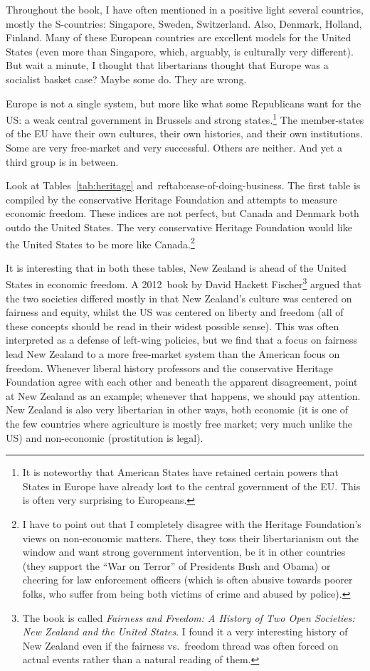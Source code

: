 Throughout the book, I have often mentioned in a positive light several
countries, mostly the S-countries: Singapore, Sweden, Switzerland. Also,
Denmark, Holland, Finland. Many of these European countries are excellent
models for the United States (even more than Singapore, which, arguably, is
culturally very different). But wait a minute, I thought that libertarians
thought that Europe was a socialist basket case? Maybe some do. They are wrong.

Europe is not a single system, but more like what some Republicans want for the
US: a weak central government in Brussels and strong states.\footnote{It is
noteworthy that American States have retained certain powers that States in
Europe have already lost to the central government of the EU. This is often
very surprising to Europeans.} The member-states of the EU have their own
cultures, their own histories, and their own institutions. Some are very
free-market and very successful. Others are neither. And yet a third group is
in between.

Look at Tables~\ref{tab:heritage} and~ref{tab:ease-of-doing-business}. The
first table is compiled by the conservative Heritage Foundation and attempts to
measure economic freedom. These indices are not perfect, but Canada and Denmark
both outdo the United States. The very conservative Heritage Foundation would
like the United States to be more like Canada.\footnote{I have to point out
that I completely disagree with the Heritage Foundation's views on non-economic
matters. There, they toss their libertarianism out the window and want strong
government intervention, be it in other countries (they support the ``War on
Terror'' of Presidents Bush and Obama) or cheering for law enforcement officers
(which is often abusive towards poorer folks, who suffer from being both
victims of crime and abused by police).}

It is interesting that in both these tables, New Zealand is ahead of the United
States in economic freedom. A 2012~book by David Hackett Fischer\footnote{The
book is called \emph{Fairness and Freedom: A History of Two Open Societies: New
Zealand and the United States}. I found it a very interesting history of New
Zealand even if the fairness vs.\ freedom thread was often forced on actual
events rather than a natural reading of them.} argued that the two societies
differed mostly in that New Zealand's culture was centered on fairness and
equity, whilst the US was centered on liberty and freedom (all of these
concepts should be read in their widest possible sense). This was often
interpreted as a defense of left-wing policies, but we find that a focus on
fairness lead New Zealand to a more free-market system than the American focus
on freedom. Whenever liberal history professors and the conservative Heritage
Foundation agree with each other and beneath the apparent disagreement, point
at New Zealand as an example; whenever that happens, we should pay attention.
New Zealand is also very libertarian in other ways, both economic (it is one of
the few countries where agriculture is mostly free market; very much unlike the
US) and non-economic (prostitution is legal).

